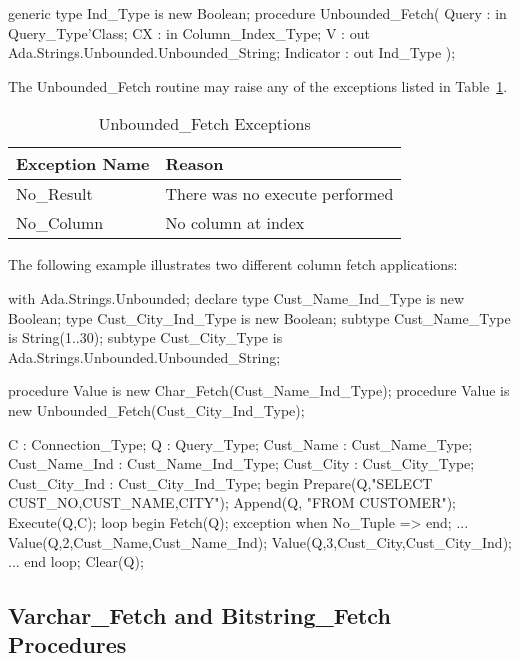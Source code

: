 \documentclass[english,letterpaper]{book}
\begin{document}
\begin{Code}
generic
   type Ind_Type is new Boolean;
procedure Unbounded_Fetch(
   Query :     in     Query_Type'Class;
   CX :        in     Column_Index_Type;
   V :            out Ada.Strings.Unbounded.Unbounded_String;
   Indicator :    out Ind_Type
);
\end{Code}

The Unbounded\_Fetch routine may raise any of the exceptions listed in Table~\ref{t:ufx}.

\begin{table}
   \begin{center}
      \begin{tabular}{ll}
         Exception Name    &  Reason\\
         \hline 
         No\_Result        &  There was no execute performed\\
         No\_Column        &  No column at index\\
      \end{tabular}
   \end{center}
   \caption{Unbounded\_Fetch Exceptions}\label{t:ufx}
\end{table}

The following example illustrates two different column fetch applications:

\begin{Example}
with Ada.Strings.Unbounded;
declare
   type Cust_Name_Ind_Type is new Boolean;
   type Cust_City_Ind_Type is new Boolean;
   subtype Cust_Name_Type is String(1..30);
   subtype Cust_City_Type is
       Ada.Strings.Unbounded.Unbounded_String;

   procedure Value is new 
       Char_Fetch(Cust_Name_Ind_Type);
   procedure Value is new 
       Unbounded_Fetch(Cust_City_Ind_Type);

   C :             Connection_Type;
   Q :             Query_Type;
   Cust_Name :     Cust_Name_Type;
   Cust_Name_Ind : Cust_Name_Ind_Type;
   Cust_City :     Cust_City_Type;
   Cust_City_Ind : Cust_City_Ind_Type;
begin
   Prepare(Q,"SELECT CUST_NO,CUST_NAME,CITY");
   Append(Q, "FROM CUSTOMER");
   Execute(Q,C);
   loop
      begin
         Fetch(Q);
      exception
         when No_Tuple =>
      end;
      ...
      Value(Q,2,Cust_Name,Cust_Name_Ind);
      Value(Q,3,Cust_City,Cust_City_Ind);
      ...
   end loop;
   Clear(Q);
\end{Example}

\subsection{Varchar\_Fetch and Bitstring\_Fetch Procedures}
\end{document}
